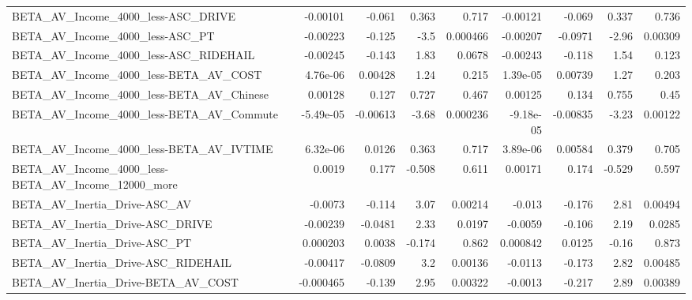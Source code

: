 \begin{tabular}{lrrrrrrrr}
BETA\_AV\_Income\_4000\_less-ASC\_DRIVE                 &    -0.00101 &       -0.061 &    0.363 &    0.717 &   -0.00121 &      -0.069 &        0.337 &         0.736 \\
BETA\_AV\_Income\_4000\_less-ASC\_PT                    &    -0.00223 &       -0.125 &     -3.5 & 0.000466 &   -0.00207 &     -0.0971 &        -2.96 &       0.00309 \\
BETA\_AV\_Income\_4000\_less-ASC\_RIDEHAIL              &    -0.00245 &       -0.143 &     1.83 &   0.0678 &   -0.00243 &      -0.118 &         1.54 &         0.123 \\
BETA\_AV\_Income\_4000\_less-BETA\_AV\_COST              &    4.76e-06 &      0.00428 &     1.24 &    0.215 &   1.39e-05 &     0.00739 &         1.27 &         0.203 \\
BETA\_AV\_Income\_4000\_less-BETA\_AV\_Chinese           &     0.00128 &        0.127 &    0.727 &    0.467 &    0.00125 &       0.134 &        0.755 &          0.45 \\
BETA\_AV\_Income\_4000\_less-BETA\_AV\_Commute           &   -5.49e-05 &     -0.00613 &    -3.68 & 0.000236 &  -9.18e-05 &    -0.00835 &        -3.23 &       0.00122 \\
BETA\_AV\_Income\_4000\_less-BETA\_AV\_IVTIME            &    6.32e-06 &       0.0126 &    0.363 &    0.717 &   3.89e-06 &     0.00584 &        0.379 &         0.705 \\
BETA\_AV\_Income\_4000\_less-BETA\_AV\_Income\_12000\_more &      0.0019 &        0.177 &   -0.508 &    0.611 &    0.00171 &       0.174 &       -0.529 &         0.597 \\
BETA\_AV\_Inertia\_Drive-ASC\_AV                       &     -0.0073 &       -0.114 &     3.07 &  0.00214 &     -0.013 &      -0.176 &         2.81 &       0.00494 \\
BETA\_AV\_Inertia\_Drive-ASC\_DRIVE                    &    -0.00239 &      -0.0481 &     2.33 &   0.0197 &    -0.0059 &      -0.106 &         2.19 &        0.0285 \\
BETA\_AV\_Inertia\_Drive-ASC\_PT                       &    0.000203 &       0.0038 &   -0.174 &    0.862 &   0.000842 &      0.0125 &        -0.16 &         0.873 \\
BETA\_AV\_Inertia\_Drive-ASC\_RIDEHAIL                 &    -0.00417 &      -0.0809 &      3.2 &  0.00136 &    -0.0113 &      -0.173 &         2.82 &       0.00485 \\
BETA\_AV\_Inertia\_Drive-BETA\_AV\_COST                 &   -0.000465 &       -0.139 &     2.95 &  0.00322 &    -0.0013 &      -0.217 &         2.89 &       0.00389 \\

\end{tabular}
